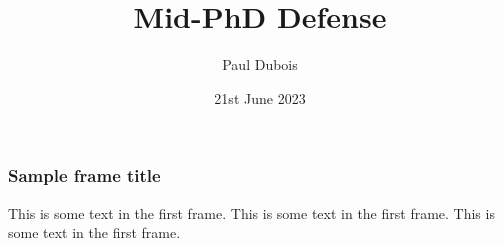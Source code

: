 \documentclass{beamer}
\title{Mid-PhD Defense}
\author{Paul Dubois}
\institute{
	TheraPanacea\\
	MICS, CentraleSupélec\\
	Institut du Cancer de Montpellier
}
\date{21st June 2023}
\begin{document}
	
	\frame{\titlepage}
	
	\begin{frame}
		\frametitle{Sample frame title}
		This is some text in the first frame. This is some text in the first frame. This is some text in the first frame.
	\end{frame}
	
\end{document}
